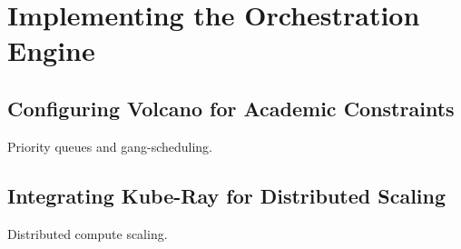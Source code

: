 \section{Implementing the Orchestration Engine}

\subsection{Configuring Volcano for Academic Constraints}

Priority queues and gang-scheduling.

\subsection{Integrating Kube-Ray for Distributed Scaling}

Distributed compute scaling.
